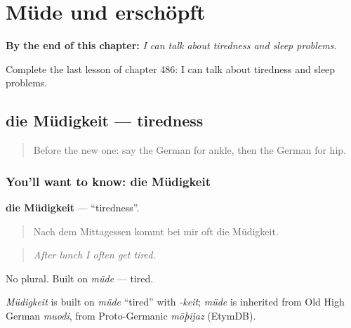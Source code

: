 
\chapter{Müde und erschöpft}
\label{ch:ge-mude-und-erschopft}

\begin{chapteropening}
\textbf{By the end of this chapter:} \emph{I can talk about tiredness and sleep problems.}

Complete the last lesson of chapter 486: I can talk about tiredness and sleep problems.
\end{chapteropening}

\section[die Müdigkeit]{die Müdigkeit — tiredness}

\label{lesson:GE-C486-muedigkeit}



\begin{quote}
Before the new one: say the German for ankle, then the German for hip.
\end{quote}

\subsection*{You'll want to know: die Müdigkeit}
\textbf{die Müdigkeit} — \textquotedblleft{}tiredness\textquotedblright{}.

\begin{quote}
Nach dem Mittagessen kommt bei mir oft die Müdigkeit.
\end{quote}

\begin{quote}
\emph{After lunch I often get tired.}
\end{quote}

No plural. Built on \emph{müde} — tired.

\begin{cousinweb}
\emph{Müdigkeit} is built on \emph{müde} \textquotedblleft{}tired\textquotedblright{} with \emph{-keit}; \emph{müde} is inherited from Old High German \emph{muodi}, from Proto-Germanic \emph{mōþijaz} (EtymDB).
\end{cousinweb}

